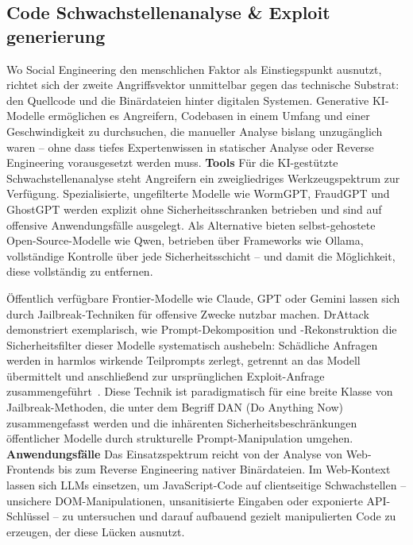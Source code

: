 \documentclass[conference]{IEEEtran}
\begin{document}
\subsection{Code Schwachstellenanalyse \& Exploit generierung}
Wo Social Engineering den menschlichen Faktor als Einstiegspunkt ausnutzt, richtet sich der zweite Angriffsvektor unmittelbar gegen das technische Substrat: den Quellcode und die Binärdateien hinter digitalen Systemen. Generative KI-Modelle ermöglichen es Angreifern, Codebasen in einem Umfang und einer Geschwindigkeit zu durchsuchen, die manueller Analyse bislang unzugänglich waren -- ohne dass tiefes Expertenwissen in statischer Analyse oder Reverse Engineering vorausgesetzt werden muss.
\newline
\newline
\textbf{Tools}
\newline
Für die KI-gestützte Schwachstellenanalyse steht Angreifern ein zweigliedriges Werkzeugspektrum zur Verfügung. Spezialisierte, ungefilterte Modelle wie WormGPT, FraudGPT und GhostGPT werden explizit ohne Sicherheitsschranken betrieben und sind auf offensive Anwendungsfälle ausgelegt. Als Alternative bieten selbst-gehostete Open-Source-Modelle wie Qwen, betrieben über Frameworks wie Ollama, vollständige Kontrolle über jede Sicherheitsschicht -- und damit die Möglichkeit, diese vollständig zu entfernen.
\newline

Öffentlich verfügbare Frontier-Modelle wie Claude, GPT oder Gemini lassen sich durch Jailbreak-Techniken für offensive Zwecke nutzbar machen. DrAttack demonstriert exemplarisch, wie Prompt-Dekomposition und -Rekonstruktion die Sicherheitsfilter dieser Modelle systematisch aushebeln: Schädliche Anfragen werden in harmlos wirkende Teilprompts zerlegt, getrennt an das Modell übermittelt und anschließend zur ursprünglichen Exploit-Anfrage zusammengeführt~\cite{li_drattack_2024}. Diese Technik ist paradigmatisch für eine breite Klasse von Jailbreak-Methoden, die unter dem Begriff DAN (Do Anything Now) zusammengefasst werden und die inhärenten Sicherheitsbeschränkungen öffentlicher Modelle durch strukturelle Prompt-Manipulation umgehen.
\newline
\newline
\textbf{Anwendungsfälle}
\newline
Das Einsatzspektrum reicht von der Analyse von Web-Frontends bis zum Reverse Engineering nativer Binärdateien. Im Web-Kontext lassen sich LLMs einsetzen, um JavaScript-Code auf clientseitige Schwachstellen -- unsichere DOM-Manipulationen, unsanitisierte Eingaben oder exponierte API-Schlüssel -- zu untersuchen und darauf aufbauend gezielt manipulierten Code zu erzeugen, der diese Lücken ausnutzt.
\newline
\end{document}
